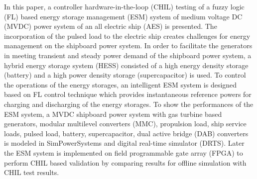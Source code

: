 In this paper, a controller hardware-in-the-loop (CHIL) testing of a fuzzy logic (FL) based energy storage management (ESM) system of medium voltage DC (MVDC) power system of an all electric ship (AES) is presented. The incorporation of the pulsed load to the electric ship creates challenges for energy management on the shipboard power system. In order to facilitate the generators in meeting transient and steady power demand of the shipboard power system, a hybrid energy storage system (HESS) consisted of a high energy density storage (battery) and a high power density storage (supercapacitor) is used. To control the operations of the energy storages, an intelligent ESM system is designed based on FL control technique which provides instantaneous reference powers for charging and discharging of the energy storages. To show the performances of the ESM system, a MVDC shipboard power system with gas turbine based generators, modular multilevel converters (MMC), propulsion load, ship service loads, pulsed load, battery, supercapacitor, dual active bridge (DAB) converters is modeled in SimPowerSystems and digital real-time simulator (DRTS). Later the ESM system is implemented on field programmable gate array (FPGA) to perform CHIL based validation by comparing results for offline simulation with CHIL test results.